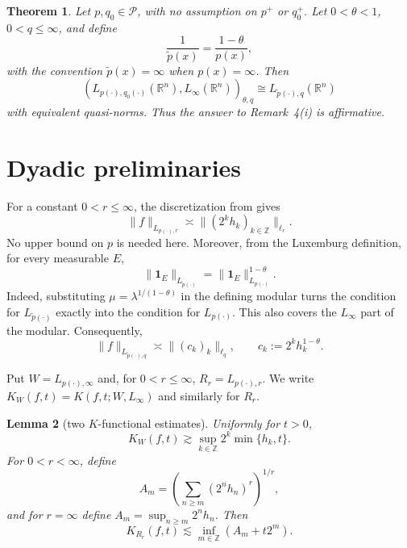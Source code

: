 \documentclass[11pt]{article}
\newtheorem{theorem}{Theorem}
\newtheorem{lemma}[theorem]{Lemma}
\newcommand{\R}{\mathbb R}
\newcommand{\1}{\mathbf 1}
\newcommand{\lesssimc}{\mathrel{\lesssim}}
\newcommand{\asympC}{\mathrel{\asymp}}
\begin{document}
\begin{theorem}\label{thm:main}
Let $p,q_0\in\mathcal P$, with no assumption on $p^+$ or $q_0^+$.
Let $0<\theta<1$, $0<q\leq\infty$, and define
\[
 \frac1{\widetilde p(x)}=\frac{1-\theta}{p(x)},
\]
with the convention $\widetilde p(x)=\infty$ when $p(x)=\infty$. Then
\[
 (L_{p(\cdot),q_0(\cdot)}(\R^n),L_\infty(\R^n))_{\theta,q}
 \cong L_{\widetilde p(\cdot),q}(\R^n)
\]
with equivalent quasi-norms.  Thus the answer to Remark~4(i) is affirmative.
\end{theorem}

\section{Dyadic preliminaries}

For a constant $0<r\leq\infty$, the discretization from \cite{KV} gives
\begin{equation}\label{eq:discrete-lorentz}
 \|f\|_{L_{p(\cdot),r}}
 \asympC \|(2^k h_k)_{k\in\mathbb Z}\|_{\ell_r}.
\end{equation}
No upper bound on $p$ is needed here.  Moreover, from the Luxemburg
definition, for every measurable $E$,
\begin{equation}\label{eq:indicator-power}
 \|\1_E\|_{L_{\widetilde p(\cdot)}}
 =\|\1_E\|_{L_{p(\cdot)}}^{1-\theta}.
\end{equation}
Indeed, substituting $\mu=\lambda^{1/(1-\theta)}$ in the defining modular
turns the condition for $L_{\widetilde p(\cdot)}$ exactly into the condition
for $L_{p(\cdot)}$.  This also covers the $L_\infty$ part of the modular.
Consequently,
\begin{equation}\label{eq:target-discrete}
 \|f\|_{L_{\widetilde p(\cdot),q}}
 \asympC \|(c_k)_k\|_{\ell_q},
 \qquad c_k:=2^k h_k^{1-\theta}.
\end{equation}

Put $W=L_{p(\cdot),\infty}$ and, for $0<r\leq\infty$,
$R_r=L_{p(\cdot),r}$.  We write $K_W(f,t)=K(f,t;W,L_\infty)$ and similarly
for $R_r$.

\begin{lemma}[two $K$-functional estimates]\label{lem:K}
Uniformly for $t>0$,
\begin{equation}\label{eq:Klower}
 K_W(f,t)\gtrsim \sup_{k\in\mathbb Z}2^k\min\{h_k,t\}.
\end{equation}
For $0<r<\infty$, define
\[
 A_m=\left(\sum_{n\geq m}(2^nh_n)^r\right)^{1/r},
\]
and for $r=\infty$ define $A_m=\sup_{n\geq m}2^nh_n$. Then
\begin{equation}\label{eq:Kupper}
 K_{R_r}(f,t)\lesssimc \inf_{m\in\mathbb Z}(A_m+t2^m).
\end{equation}
\end{lemma}
\end{document}
